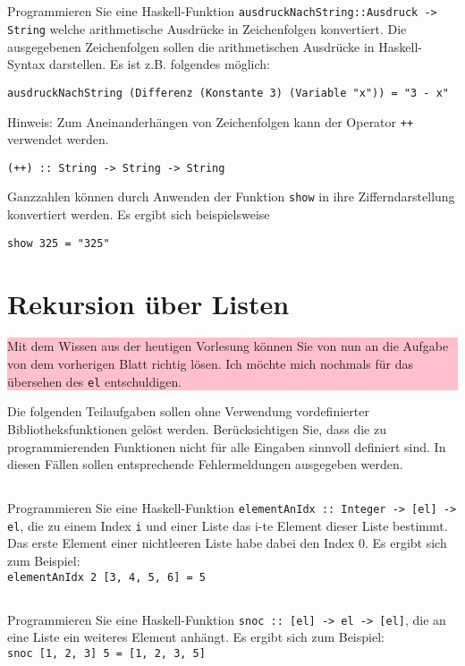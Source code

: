 \documentclass[
  10pt,                   %
  DIV12,
  german,                 %
  oneside,                %
  parskip=half,           %
  headings=normal,        %
  captions=tableheading,  %
]{scrartcl}
\begin{document}
\subsection{}
Programmieren Sie eine Haskell-Funktion \lstinline|ausdruckNachString::Ausdruck -> String|
welche arithmetische Ausdrücke in Zeichenfolgen konvertiert. Die ausgegebenen
Zeichenfolgen sollen die arithmetischen Ausdrücke in Haskell-Syntax darstellen. Es ist z.B. folgendes möglich:
\begin{lstlisting}
ausdruckNachString (Differenz (Konstante 3) (Variable "x")) = "3 - x"
\end{lstlisting}
Hinweis:
Zum Aneinanderhängen von Zeichenfolgen kann der Operator \lstinline|++| verwendet werden.
\begin{lstlisting}
(++) :: String -> String -> String
\end{lstlisting}
Ganzzahlen können durch Anwenden der Funktion \lstinline|show| in
ihre Zifferndarstellung konvertiert werden. Es ergibt sich beispielsweise
\begin{lstlisting}
show 325 = "325"
\end{lstlisting}
\section{Rekursion über Listen}


\colorbox{pink}{\parbox{\textwidth}{%
  \vskip10pt
  Mit dem Wissen aus der heutigen Vorlesung können Sie von nun an die Aufgabe von dem 
  vorherigen Blatt richtig lösen. Ich möchte mich nochmals für das übersehen des
  \lstinline|el| entschuldigen.
  \vskip10pt
 }
}

Die folgenden Teilaufgaben sollen ohne Verwendung vordefinierter Bibliotheksfunktionen gelöst werden. Berücksichtigen Sie, dass die zu programmierenden Funktionen nicht für alle Eingaben sinnvoll definiert sind. In diesen Fällen sollen entsprechende Fehlermeldungen ausgegeben werden.
\subsection{}	
Programmieren Sie eine Haskell-Funktion \lstinline|elementAnIdx :: Integer -> [el] -> el|, die zu einem Index \lstinline|i| und einer Liste das i-te Element dieser Liste bestimmt. Das erste Element einer nichtleeren Liste habe dabei den Index $0$. Es ergibt sich zum Beispiel:\\
\lstinline|elementAnIdx 2 [3, 4, 5, 6] = 5|
\subsection{}
Programmieren Sie eine Haskell-Funktion \lstinline|snoc :: [el] -> el -> [el]|, die an eine Liste ein weiteres Element anhängt. Es ergibt sich zum Beispiel:\\
\lstinline|snoc [1, 2, 3] 5 = [1, 2, 3, 5]|
\end{document}
